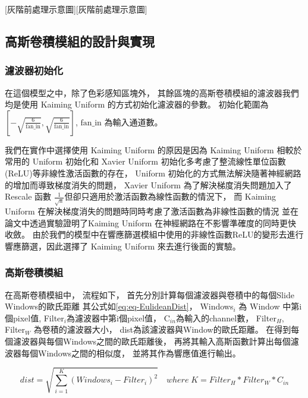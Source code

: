 \documentclass[class=NCU_thesis, crop=false]{standalone}
\begin{document}
		[灰階前處理示意圖][灰階前處理示意圖]

	\subsection{高斯卷積模組的設計與實現}
		\subsubsection{濾波器初始化}
			在這個模型之中，除了色彩感知區塊外，
			其餘區塊的高斯卷積模組的濾波器我們均是使用 Kaiming Uniform \cite{DBLP:journals/corr/HeZR015}的方式初始化濾波器的參數。
			初始化範圍為$[-\sqrt{\frac{6}{\text{fan\_in}}}, \sqrt{\frac{6}{\text{fan\_in}}}]$,
			$\text{fan\_in}$ 為輸入通道數。

			我們在實作中選擇使用 Kaiming Uniform 的原因是因為 Kaiming Uniform 相較於常用的 Uniform 初始化和 Xavier Uniform\cite{pmlr-v9-glorot10a} 初始化多考慮了整流線性單位函數(ReLU)等非線性激活函數的存在，
			Uniform 初始化的方式無法解決隨著神經網路的增加而導致梯度消失的問題，
			Xavier Uniform 為了解決梯度消失問題加入了 Rescale 函數 $\frac{1}{\sqrt{\text{n}}}$但卻只適用於激活函數為線性函數的情況下，
			而 Kaiming Uniform 在解決梯度消失的問題時同時考慮了激活函數為非線性函數的情況
			並在論文\cite{DBLP:journals/corr/HeZR015}中透過實驗證明了Kaiming Uniform 在神經網路在不影響準確度的同時更快收斂。
			由於我們的模型中在響應篩選模組中使用的非線性函數ReLU的變形去進行響應篩選，因此選擇了 Kaiming Uniform 來去進行後面的實驗。

		\subsubsection{高斯卷積模組}
			在高斯卷積模組中，
			流程如下，
			首先分別計算每個濾波器與卷積中的每個Slide Windows的歐氏距離
			其公式如\cref{eq:eq-EulideanDist}，
			Windows$_{i}$ 為 Window 中第i個pixel值, 
			Filter$_{i}$為濾波器中第i個pixel值，
			C$_{in}$為輸入的channel數，
			Filter$_{H}$, Filter$_{W}$ 為卷積的濾波器大小，
			dist為該濾波器與Window的歐氏距離。
			在得到每個濾波器與每個Windows之間的歐氏距離後，
			再將其輸入高斯函數計算出每個濾波器每個Windows之間的相似度，
			並將其作為響應值進行輸出。

			\begin{equation}
			    \label{eq:eq-EulideanDist}
			    dist = \sqrt{\sum_{i = 1}^{K} (Windows_{i} - Filter_{i})^{2}} \quad where \; K = Filter_{H} * Filter_{W} * C_{in}
			\end{equation}
\end{document}
